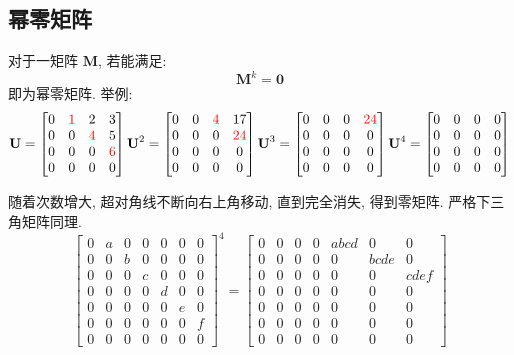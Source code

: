 \documentclass[UTF8]{ctexart}
\newcommand{\ve}[1]{\boldsymbol{\mathbf{#1}}}
\begin{document}
\subsection{幂零矩阵}
对于一矩阵 $ \ve M $, 若能满足: \[ \ve M^k = \ve 0 \]
即为幂零矩阵. 举例:
\[ 
\ve U = \begin{bmatrix}
    0 & {\color{red}1} & 2 & 3 \\
    0 & 0 & {\color{red}4} & 5 \\
    0 & 0 & 0 & {\color{red}6} \\
    0 & 0 & 0 & 0
\end{bmatrix}
\ve U^2 =
\begin{bmatrix}
    0 & 0 & {\color{red}4} & 17 \\
    0 & 0 & 0 & {\color{red}24} \\
    0 & 0 & 0 & 0 \\
    0 & 0 & 0 & 0
\end{bmatrix}
\ve U^3 = 
\begin{bmatrix}
    0 & 0 & 0 & {\color{red}24} \\
    0 & 0 & 0 & 0 \\
    0 & 0 & 0 & 0 \\
    0 & 0 & 0 & 0
\end{bmatrix}
\ve U^4 = 
\begin{bmatrix}
    0 & 0 & 0 & 0 \\
    0 & 0 & 0 & 0 \\
    0 & 0 & 0 & 0 \\
    0 & 0 & 0 & 0
\end{bmatrix}
\]

随着次数增大, 超对角线不断向右上角移动, 直到完全消失, 得到零矩阵. 严格下三角矩阵同理.
\[
\begin{bmatrix}
0&a&0&0&0&0&0\\ 
0&0&b&0&0&0&0\\ 
0&0&0&c&0&0&0\\ 
0&0&0&0&d&0&0\\ 
0&0&0&0&0&e&0\\ 
0&0&0&0&0&0&f\\ 
0&0&0&0&0&0&0\end{bmatrix}^{\! 4}
=
\begin{bmatrix}
0&0&0&0&abcd&0&0\\ 
0&0&0&0&0&bcde&0\\ 
0&0&0&0&0&0&cdef\\ 
0&0&0&0&0&0&0\\ 
0&0&0&0&0&0&0\\ 
0&0&0&0&0&0&0\\ 
0&0&0&0&0&0&0\end{bmatrix}
\]
\end{document}
